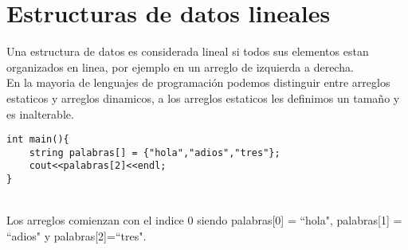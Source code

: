 \section{Estructuras de datos lineales}

Una estructura de datos es considerada lineal si todos sus elementos estan organizados en linea, por ejemplo en un arreglo de izquierda a derecha.
\\En la mayoria de lenguajes de programación podemos distinguir entre arreglos estaticos y arreglos dinamicos, a los arreglos estaticos les definimos un tamaño y es inalterable.
\\\begin{minipage}{\textwidth}
\begin{lstlisting}[style=C,caption=arregloEstatico.cpp]
int main(){
    string palabras[] = {"hola","adios","tres"};
    cout<<palabras[2]<<endl;
}
\end{lstlisting}
\end{minipage}
\\Los arreglos comienzan con el indice 0 siendo palabras[0] = ``hola", palabras[1] = ``adios"{} y palabras[2]=``tres".
